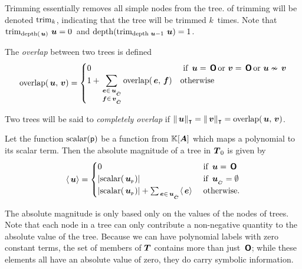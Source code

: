 Trimming essentially removes all simple nodes from the tree.
of trimming will be denoted $\operatorname{trim}_{k}$, indicating that the tree
 will be trimmed $k$\ times. Note that
$\operatorname{trim}_{\operatorname{depth}(\,\boldsymbol{u})}{\,\boldsymbol{u}} = 0$\ and
$\operatorname{depth}(\operatorname{trim}_{\operatorname{depth}{\,\boldsymbol{u}}-1}{\,\boldsymbol{u}}) = 1$.

\begin{definition}
  The \emph{overlap} between two trees is defined
  \[
  \operatorname{overlap}(\,\boldsymbol{u},\,\boldsymbol{v}) = \begin{cases}
    0 & \text{ if } \,\boldsymbol{u} = \,\boldsymbol{\mathsf{O}} \operatorname{\text{or}} \,\boldsymbol{v} = \,\boldsymbol{\mathsf{O}} \operatorname{\text{or}} \,\boldsymbol{u}\nsim\,\boldsymbol{v} \\
    1 + \displaystyle\sum_{\substack{\,\boldsymbol{e}\in{\,\boldsymbol{u}}_{{}_{\bar{\boldsymbol{C}}}} \\ \,\boldsymbol{f}\in{\,\boldsymbol{v}}_{{}_{\bar{\boldsymbol{C}}}}}} \operatorname{overlap}(\,\boldsymbol{e},\,\boldsymbol{f}) & \text{otherwise}
  \end{cases}
  \]

  Two trees will be said to \emph{completely overlap} if
  $\lVert{\,\boldsymbol{u}}\rVert_{\intercal} = \lVert{\,\boldsymbol{v}}\rVert_{\intercal} = \operatorname{overlap}(\,\boldsymbol{u},\,\boldsymbol{v})$.

\end{definition}

\begin{definition}\label{absolute-mag}
  Let the function $\operatorname{scalar}(\mathsf{p})$ be a function from $\mathbb{K}[{\boldsymbol{A}}]$ which
  maps a polynomial to its scalar term. Then the absolute magnitude of
  a tree in $\boldsymbol{T}_0$ is given by
  \begin{align*}
    \langle{\,\boldsymbol{u}}\rangle = \begin{cases}
      0 & \text{ if } \,\boldsymbol{u} = \,\boldsymbol{\mathsf{O}} \\
      \lvert{\operatorname{scalar}({\,\boldsymbol{u}}_{{}_{\mathsf{P}}})}\rvert & \text{ if }{\,\boldsymbol{u}}_{{}_{\bar{\boldsymbol{C}}}} = \emptyset \\
      \lvert{\operatorname{scalar}({\,\boldsymbol{u}}_{{}_{\mathsf{P}}})}\rvert + \sum_{\,\boldsymbol{e}\in{\,\boldsymbol{u}}_{{}_{\bar{\boldsymbol{C}}}}}\langle{\,\boldsymbol{e}}\rangle & \text{ otherwise.}
    \end{cases}
  \end{align*}
\end{definition}

The absolute magnitude is only based only on the values of the
nodes of trees. %
Note that each node in a tree can only contribute a non-negative
quantity to the absolute value of the tree. Because we can have
polynomial labels with zero constant terms, the set of members of
$\boldsymbol{T}$ contains more than just $\,\boldsymbol{\mathsf{O}}$; while these elements all
have an absolute value of zero, they do carry symbolic information.

